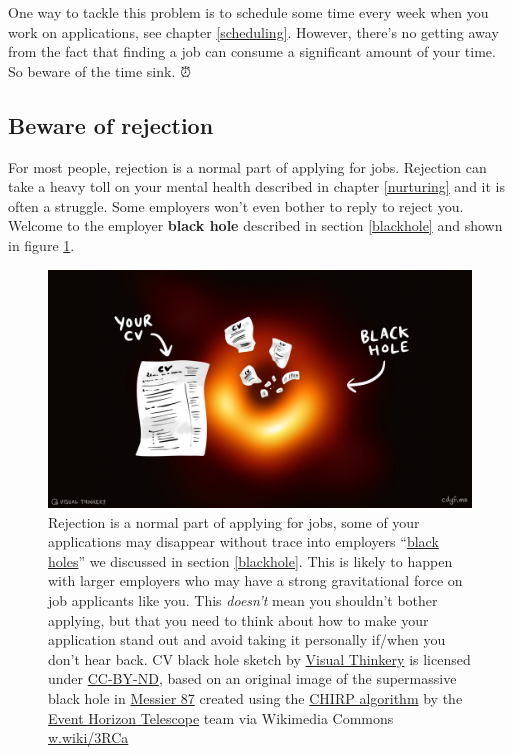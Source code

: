 \documentclass[
]{book}
\begin{document}
One way to tackle this problem is to schedule some time every week when you work on applications, see chapter \ref{scheduling}. However, there's no getting away from the fact that finding a job can consume a significant amount of your time. So beware of the time sink. ⏰

\hypertarget{rejection}{%
\subsection{Beware of rejection}\label{rejection}}

For most people, rejection is a normal part of applying for jobs. Rejection can take a heavy toll on your mental health described in chapter \ref{nurturing} and it is often a struggle. Some employers won't even bother to reply to reject you. Welcome to the employer \textbf{black hole} described in section \ref{blackhole} and shown in figure \ref{fig:blackhole-fig}.

\begin{figure}

{\centering \includegraphics[width=0.98\linewidth]{images/Black-hole-CV} 

}

\caption{Rejection is a normal part of applying for jobs, some of your applications may disappear without trace into employers ``\href{https://en.wikipedia.org/wiki/Black_hole}{black holes}'' we discussed in section \ref{blackhole}. This is likely to happen with larger employers who may have a strong gravitational force on job applicants like you. This \emph{doesn't} mean you shouldn't bother applying, but that you need to think about how to make your application stand out and avoid taking it personally if/when you don't hear back. CV black hole sketch by \href{https://visualthinkery.com/}{Visual Thinkery} is licensed under \href{https://creativecommons.org/licenses/by-nd/4.0/}{CC-BY-ND}, based on an original image of the supermassive black hole in \href{https://en.wikipedia.org/wiki/Messier_87}{Messier 87} created using the \href{https://en.wikipedia.org/wiki/CHIRP_(algorithm)}{CHIRP algorithm} by the \href{https://en.wikipedia.org/wiki/Event_Horizon_Telescope}{Event Horizon Telescope} team via Wikimedia Commons \href{https://w.wiki/3RCa}{w.wiki/3RCa}}\label{fig:blackhole-fig}
\end{figure}
\end{document}
